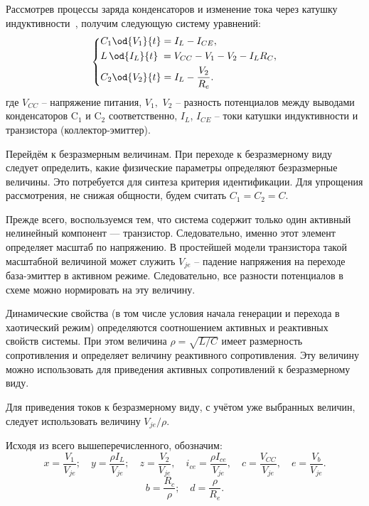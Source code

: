 Рассмотрев процессы заряда конденсаторов и изменение тока через
катушку индуктивности~\cite{zaeplnii_radio_calc},
получим следующую систему уравнений:
%
\begin{equation}
\label{atu:eq:colp_phys}
\begin{dcases}
  C_1 \od{V_{1}}{t}  = I_L - I_{CE} , \\
  L\, \od{I_L}{t} \; = V_{CC} - V_{1} - V_{2} - I_L R_C , \\
  C_2 \od{V_{2}}{t}  = I_L - \frac{V_{2}}{R_e}.
\end{dcases}
\end{equation}
%
%
где
$V_{CC} $ -- напряжение питания,
$V_1,$ $V_2$ -- разность потенциалов между выводами конденсаторов
$\mathrm{C}_1$ и $\mathrm{C}_2$ соответственно,
$I_L$, $I_{CE}$ -- токи катушки индуктивности и транзистора (коллектор-эмиттер).

Перейдём к безразмерным величинам.
При переходе к безразмерному виду следует определить,
какие физические параметры определяют безразмерные величины.
Это потребуется для синтеза критерия идентификации.
Для упрощения рассмотрения, не снижая общности,
будем считать $C_1 = C_2 = C$.

Прежде всего, воспользуемся тем, что система содержит только один
активный нелинейный компонент --- транзистор.
Следовательно, именно этот элемент определяет
масштаб по напряжению. В простейшей модели транзистора
такой масштабной величиной может служить
$V_{je}$ -- падение напряжения на переходе база-эмиттер
в активном режиме. Следовательно, все разности потенциалов в схеме можно нормировать
на эту величину.

Динамические свойства (в том числе условия начала генерации и перехода в хаотический режим) определяются
соотношением активных и реактивных свойств системы. При этом величина
$ \rho = \sqrt{L/C} $ имеет размерность сопротивления
и определяет величину реактивного сопротивления. Эту величину можно использовать
для приведения активных сопротивлений к безразмерному виду.

Для приведения токов к безразмерному виду, с учётом уже выбранных величин,
следует использовать величину $ V_{je} / \rho$.


Исходя из всего вышеперечисленного, обозначим:
%
\[
  x = \frac{V_{1}}{V_{je}} ; \quad
  y = \frac{\rho I_L}{V_{je}} ; \quad
  z = \frac{V_{2}}{V_{je}}, \quad
  i_{ce} = \frac{\rho I_{ce}}{V_{je}}, \quad
  c = \frac{V_{CC}}{V_{je}}, \quad
  e = \frac{V_{b}}{V_{je}}.
\]
%
\[
  b = \frac{R_c}{\rho}; \quad
  d = \frac{\rho}{R_e}. %
\]

